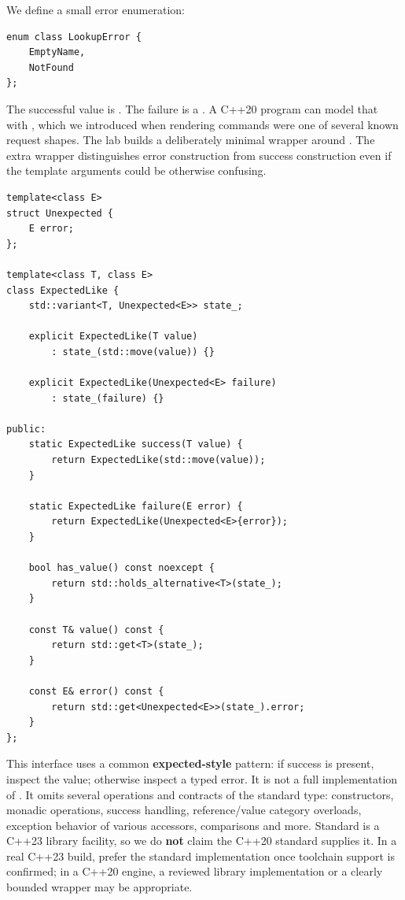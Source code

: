 \hypertarget{05-engine-i-ch006-one-value-or-one-explanation-without-pretending-c20-already-has-stdexpected}{}

We define a small error enumeration:

\begin{verbatim}
enum class LookupError {
    EmptyName,
    NotFound
};
\end{verbatim}

The successful value is . The failure is a . A C++20 program can model that with , which we introduced when rendering commands were one of several known request shapes. The lab builds a deliberately minimal  wrapper around . The extra  wrapper distinguishes error construction from success construction even if the template arguments could be otherwise confusing.

\begin{verbatim}
template<class E>
struct Unexpected {
    E error;
};

template<class T, class E>
class ExpectedLike {
    std::variant<T, Unexpected<E>> state_;

    explicit ExpectedLike(T value)
        : state_(std::move(value)) {}

    explicit ExpectedLike(Unexpected<E> failure)
        : state_(failure) {}

public:
    static ExpectedLike success(T value) {
        return ExpectedLike(std::move(value));
    }

    static ExpectedLike failure(E error) {
        return ExpectedLike(Unexpected<E>{error});
    }

    bool has_value() const noexcept {
        return std::holds_alternative<T>(state_);
    }

    const T& value() const {
        return std::get<T>(state_);
    }

    const E& error() const {
        return std::get<Unexpected<E>>(state_).error;
    }
};
\end{verbatim}

This interface uses a common \textbf{expected-style} pattern: if success is present, inspect the value; otherwise inspect a typed error. It is not a full implementation of . It omits several operations and contracts of the standard type: constructors, monadic operations,  success handling, reference/value category overloads, exception behavior of various accessors, comparisons and more. Standard  is a C++23 library facility, so we do \textbf{not} claim the C++20 standard supplies it. In a real C++23 build, prefer the standard implementation once toolchain support is confirmed; in a C++20 engine, a reviewed library implementation or a clearly bounded wrapper may be appropriate.

